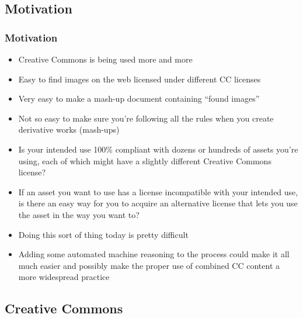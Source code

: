 \documentclass[mathserif,xcolor=dvipsnames,handout]{beamer}
\begin{document}
    \subsection{Motivation}
    \begin{frame}[t]
        \frametitle{Motivation}
        \begin{itemize}
            \item<2-> Creative Commons is being used more and more
            \item<3-> Easy to find images on the web licensed under different CC licenses
            \item<4-> Very easy to make a mash-up document containing ``found images''
            \item<5-> Not so easy to make sure you're following all the rules when
                  you create derivative works (mash-ups)
            \item<6-> Is your intended use 100\% compliant with dozens or hundreds
                  of assets you're using, each of which might have a slightly different
                  Creative Commons license?
            \item<7-> If an asset you want to use has a license incompatible with
                  your intended use, is there an easy way for you to acquire an alternative
                  license that lets you use the asset in the way you want to?
            \item<8-> Doing this sort of thing today is pretty difficult
            \item<9-> Adding some automated machine reasoning to the process could
                  make it all much easier and possibly make the proper use of combined CC content
                  a more widespread practice
        \end{itemize}
    \end{frame}

    \subsection{Creative Commons}
\end{document}
